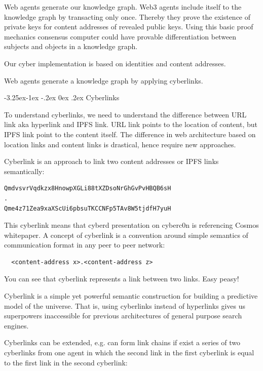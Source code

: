 \documentclass[8pt,oneside]{amsart}
\makeatletter
\newcommand{\linkred}[2]{\href{#1}{\color{red}{#2}}}
\renewcommand\subsection{\@startsection{subsection}{2}{\z@}%
                                     {-3.25ex\@plus -1ex \@minus -.2ex}%
                                     {0ex \@plus .2ex}%
                                     {\play\Large}}%
\newcommand{\titleSection}[1]{\subsection{#1}}
\newcommand{\code}[1]{{\PlayBold #1}}
\makeatother
\begin{document}
Web agents generate our knowledge graph. Web3 agents include itself to the knowledge graph by transacting only once. Thereby they prove the existence of private keys for content addresses of revealed public keys. Using this basic proof mechanics consensus computer could have provable differentiation between subjects and objects in a knowledge graph.

Our \code{cyber} implementation is based on \linkred{https://github.com/cosmos/cosmos-sdk}{cosmos-sdk} identities and \linkred{https://github.com/multiformats/cid#cidv0}{cidv0} content addresses.

Web agents generate a knowledge graph by applying \code{cyberlinks}.

\titleSection{Cyberlinks}\label{cyberlinks}

To understand cyberlinks, we need to understand the difference between \code{URL link} aka hyperlink and \code{IPFS link}. \code{URL link} points to the location of content, but \code{IPFS link} point to the content itself. The difference in web architecture based on location links and content links is drastical, hence require new approaches.

\code{Cyberlink} is an approach to link two content addresses or \code{IPFS links} semantically:

\begin{lstlisting}
QmdvsvrVqdkzx8HnowpXGLi88tXZDsoNrGhGvPvHBQB6sH
.
Qme4z71Zea9xaXScUi6pbsuTKCCNFp5TAv8W5tjdfH7yuH
\end{lstlisting}

This \code{cyberlink} means that cyberd presentation on cyberc0n is referencing Cosmos whitepaper. A concept of \code{cyberlink} is a convention around simple semantics of communication format in any peer to peer network:

\begin{lstlisting}
  <content-address x>.<content-address z>
\end{lstlisting}

You can see that \code{cyberlink} represents a link between two links. Easy peasy!

Cyberlink is a simple yet powerful semantic construction for building a predictive model of the universe. That is, using \code{cyberlinks} instead of \code{hyperlinks} gives us superpowers inaccessible for previous architectures of general purpose search engines.

Cyberlinks can be extended, e.g. can form link chains if exist a series of two cyberlinks from one agent in which the second link in the first cyberlink is equal to the first link in the second cyberlink:
\end{document}
